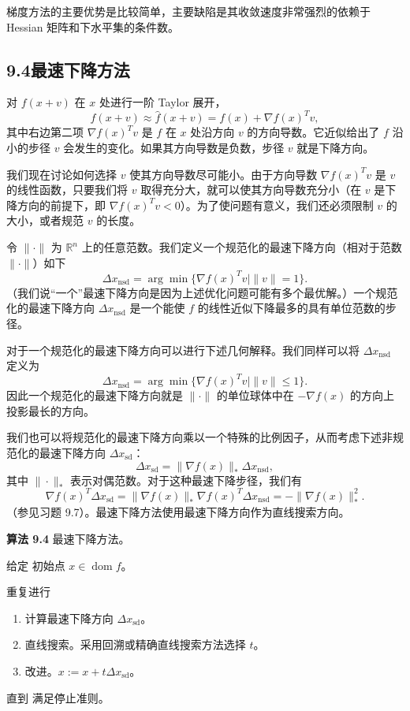 \documentclass[UTF8,12pt,a4paper,fontset=fandol]{ctexart}
\begin{document}
梯度方法的主要优势是比较简单，主要缺陷是其收敛速度非常强烈的依赖于 Hessian 矩阵和下水平集的条件数。

\subsection*{9.4\quad 最速下降方法}

对 $f(x+v)$ 在 $x$ 处进行一阶 Taylor 展开，
\[
f(x+v)\approx \hat{f}(x+v)=f(x)+\nabla f(x)^Tv,
\]
其中右边第二项 $\nabla f(x)^Tv$ 是 $f$ 在 $x$ 处沿方向 $v$ 的方向导数。它近似给出了 $f$ 沿小的步径 $v$ 会发生的变化。如果其方向导数是负数，步径 $v$ 就是下降方向。

我们现在讨论如何选择 $v$ 使其方向导数尽可能小。由于方向导数 $\nabla f(x)^Tv$ 是 $v$ 的线性函数，只要我们将 $v$ 取得充分大，就可以使其方向导数充分小（在 $v$ 是下降方向的前提下，即 $\nabla f(x)^Tv<0$）。为了使问题有意义，我们还必须限制 $v$ 的大小，或者规范 $v$ 的长度。

令 $\|\cdot\|$ 为 $\mathbb{R}^n$ 上的任意范数。我们定义一个规范化的最速下降方向（相对于范数 $\|\cdot\|$）如下
\begin{equation}
\Delta x_{\mathrm{nsd}}=\arg\min\{\nabla f(x)^Tv\mid \|v\|=1\}.
\tag{9.23}
\end{equation}
（我们说“一个”最速下降方向是因为上述优化问题可能有多个最优解。）一个规范化的最速下降方向 $\Delta x_{\mathrm{nsd}}$ 是一个能使 $f$ 的线性近似下降最多的具有单位范数的步径。

对于一个规范化的最速下降方向可以进行下述几何解释。我们同样可以将 $\Delta x_{\mathrm{nsd}}$ 定义为
\[
\Delta x_{\mathrm{nsd}}=\arg\min\{\nabla f(x)^Tv\mid \|v\|\leq1\}.
\]
因此一个规范化的最速下降方向就是 $\|\cdot\|$ 的单位球体中在 $-\nabla f(x)$ 的方向上投影最长的方向。

我们也可以将规范化的最速下降方向乘以一个特殊的比例因子，从而考虑下述非规范化的最速下降方向 $\Delta x_{\mathrm{sd}}$：
\begin{equation}
\Delta x_{\mathrm{sd}}=\|\nabla f(x)\|_\ast\Delta x_{\mathrm{nsd}},
\tag{9.24}
\end{equation}
其中 $\|\cdot\|_\ast$ 表示对偶范数。对于这种最速下降步径，我们有
\[
\nabla f(x)^T\Delta x_{\mathrm{sd}}
=\|\nabla f(x)\|_\ast\nabla f(x)^T\Delta x_{\mathrm{nsd}}
=-\|\nabla f(x)\|_\ast^2.
\]
（参见习题 9.7）。最速下降方法使用最速下降方向作为直线搜索方向。

\noindent\textbf{算法 9.4}\quad
最速下降方法。

给定 初始点 $x\in\operatorname{dom} f$。

重复进行
\begin{enumerate}
\item 计算最速下降方向 $\Delta x_{\mathrm{sd}}$。
\item 直线搜索。采用回溯或精确直线搜索方法选择 $t$。
\item 改进。$x:=x+t\Delta x_{\mathrm{sd}}$。
\end{enumerate}
直到 满足停止准则。
\end{document}
